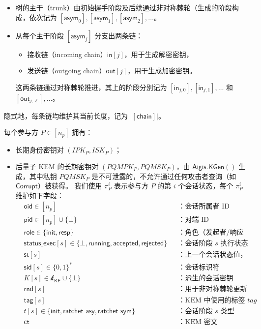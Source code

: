 \begin{itemize}
    \item 树的主干（trunk）由初始握手阶段及后续通过非对称棘轮（生成的阶段构成，依次记为 $[\mathsf{asym}_0], [\mathsf{asym}_1], [\mathsf{asym}_2], \dots$。
    
    \item 从每个主干阶段 $[\mathsf{asym}_j]$ 分支出两条链：
    \begin{itemize}
        \item 接收链（incoming chain）$\mathsf{in}[j]$，用于生成解密密钥，
        \item 发送链（outgoing chain）$\mathsf{out}[j]$，用于生成加密密钥。
    \end{itemize}
    这两条链通过对称棘轮推进，其上的阶段分别记为 $[\mathsf{in}_{j,0}], [\mathsf{in}_{j,1}], \dots$ 和 $[\mathsf{out}_{j,\ell}], \dots$。
    

\end{itemize}
隐式地，每条链均维护其当前长度，记为 $\bigl|[\mathsf{chain}]\bigr|$。
\begin{definition}[参与方和会话状态定义]
每个参与方 $P \in [n_p]$ 拥有：
\begin{itemize}
  \item 长期身份密钥对 $(IPK_P, ISK_P)$；
  \item 后量子 KEM 的长期密钥对 $(PQMPK_P, PQMSK_P)$，由 $\mathsf{Aigis.KGen}()$ 生成，其中私钥 $PQMSK_P$ 是不可泄露的，不允许通过任何攻击者查询（如 $\mathsf{Corrupt}$）被获得。
我们使用 $\pi_P^i$ 表示参与方 $P$ 的第 $i$ 个会话状态，每个 $\pi_P^i$ 维护如下字段：
\begin{align*}
  &\mathsf{oid} \in [n_p] && \text{：会话所属者 ID} \\
  &\mathsf{pid} \in [n_p] \cup \{\bot\} && \text{：对端 ID} \\
  &\mathsf{role} \in \{\mathsf{init}, \mathsf{resp}\} && \text{：角色（发起者/响应者）} \\
  &\mathsf{status\_exec}[s] \in \{\bot, \mathsf{running}, \mathsf{accepted}, \mathsf{rejected}\} && \text{：会话阶段 } s \text{ 执行状态} \\
  &\mathsf{st}[s] && \text{：上一个会话状态值，包括根密钥等} \\
  &\mathsf{sid}[s] \in \{0,1\}^* && \text{：会话标识符} \\
  &K[s] \in \mathcal{k}_{\mathsf{KE}} \cup \{\bot\} && \text{：派生的会话密钥} \\
  &\mathsf{rnd}[s] && \text{：用于非对称棘轮更新的随机数} \\
  &\mathsf{tag}[s] && \text{：KEM 中使用的标签 } tag \\
  &t[s] \in \{\mathsf{init}, \mathsf{ratchet\_asy}, \mathsf{ratchet\_sym}\} && \text{：会话阶段 } s \text{ 类型} \\
  &\mathsf{ct} && \text{：KEM 密文 ciphertext}
\end{align*}
\end{itemize}
\end{definition}


